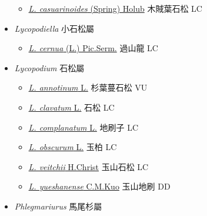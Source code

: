 \begin{itemize}
  \begin{itemize}
        \item[] \href{http://www.theplantlist.org/tpl1.1/search?q=Lycopodiastrum+casuarinoides}{\textit{L. casuarinoides} (Spring) Holub}   木賊葉石松   LC
  \end{itemize}
 \item[    ] \textit{Lycopodiella} 小石松屬
                                
  \begin{itemize}
        \item[] \href{http://www.theplantlist.org/tpl1.1/search?q=Lycopodiella+cernua}{\textit{L. cernua} (L.) Pic.Serm.}   過山龍   LC
  \end{itemize}
 \item[    ] \textit{Lycopodium} 石松屬
                                
  \begin{itemize}
        \item[] \href{http://www.theplantlist.org/tpl1.1/search?q=Lycopodium+annotinum}{\textit{L. annotinum} L.}   杉葉蔓石松   VU
        \item[] \href{http://www.theplantlist.org/tpl1.1/search?q=Lycopodium+clavatum}{\textit{L. clavatum} L.}   石松   LC
        \item[] \href{http://www.theplantlist.org/tpl1.1/search?q=Lycopodium+complanatum}{\textit{L. complanatum} L.}   地刷子   LC
        \item[] \href{http://www.theplantlist.org/tpl1.1/search?q=Lycopodium+obscurum}{\textit{L. obscurum} L.}   玉柏   LC
        \item[] \href{http://www.theplantlist.org/tpl1.1/search?q=Lycopodium+veitchii}{\textit{L. veitchii} H.Christ}   玉山石松   LC
        \item[] \href{http://www.theplantlist.org/tpl1.1/search?q=Lycopodium+yueshanense}{\textit{L. yueshanense} C.M.Kuo}   玉山地刷   DD
  \end{itemize}
 \item[    ] \textit{Phlegmariurus} 馬尾杉屬
                                

\end{itemize}
